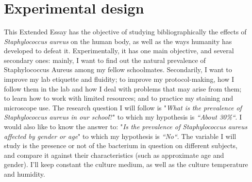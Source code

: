 \section{Experimental design}
\paragraph{}This Extended Essay has the objective of studying bibliographically the effects of \emph{Staphylococcus aureus} on the human body, as well as the ways humanity has developed to defeat it. Experimentally, it has one main objective, and several secondary ones: mainly, I want to find out the natural prevalence of Staphylococcus Aureus among my fellow schoolmates. Secondarily, I want to improve my lab etiquette and fluidity; to improve my protocol-making, how I follow them in the lab and how I deal with problems that may arise from them; to learn how to work with limited resources; and to practice my staining and microscope use. The research question I will follow is "\emph{What is the prevalence of \emph{Staphylococcus aureus} in our school}?" to which my hypothesis is \emph{``About 30\%``}. I would also like to know the answer to: "\emph{Is the prevalence of \emph{Staphylococcus aureus} affected by gender or age}" to which my hypothesis is \emph{``No``}.  The variable I will study is the presence or not of the bacterium in question on different subjects, and compare it against their characteristics (such as approximate age and gender). I'll keep constant the culture medium, as well as the culture temperature and humidity.

